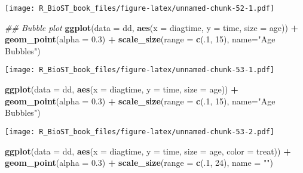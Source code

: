 \documentclass[
]{book}
\newenvironment{Shaded}{\begin{snugshade}}{\end{snugshade}}
\newcommand{\CommentTok}[1]{\textcolor[rgb]{0.56,0.35,0.01}{\textit{#1}}}
\newcommand{\DataTypeTok}[1]{\textcolor[rgb]{0.13,0.29,0.53}{#1}}
\newcommand{\DecValTok}[1]{\textcolor[rgb]{0.00,0.00,0.81}{#1}}
\newcommand{\FloatTok}[1]{\textcolor[rgb]{0.00,0.00,0.81}{#1}}
\newcommand{\KeywordTok}[1]{\textcolor[rgb]{0.13,0.29,0.53}{\textbf{#1}}}
\newcommand{\NormalTok}[1]{#1}
\newcommand{\OperatorTok}[1]{\textcolor[rgb]{0.81,0.36,0.00}{\textbf{#1}}}
\newcommand{\StringTok}[1]{\textcolor[rgb]{0.31,0.60,0.02}{#1}}
\begin{document}
\texttt{[image: R\_BioST\_book\_files/figure-latex/unnamed-chunk-52-1.pdf]}

\begin{Shaded}
\begin{Highlighting}[]
\CommentTok{\#\# Bubble plot}
\KeywordTok{ggplot}\NormalTok{(}\DataTypeTok{data =}\NormalTok{ dd, }\KeywordTok{aes}\NormalTok{(}\DataTypeTok{x =}\NormalTok{ diagtime, }\DataTypeTok{y =}\NormalTok{ time, }\DataTypeTok{size =}\NormalTok{ age)) }\OperatorTok{+}\StringTok{ }
\StringTok{  }\KeywordTok{geom\_point}\NormalTok{(}\DataTypeTok{alpha =} \FloatTok{0.3}\NormalTok{) }\OperatorTok{+}\StringTok{ }
\StringTok{  }\KeywordTok{scale\_size}\NormalTok{(}\DataTypeTok{range =} \KeywordTok{c}\NormalTok{(.}\DecValTok{1}\NormalTok{, }\DecValTok{15}\NormalTok{), }\DataTypeTok{name=}\StringTok{"Age Bubbles"}\NormalTok{)}
\end{Highlighting}
\end{Shaded}

\texttt{[image: R\_BioST\_book\_files/figure-latex/unnamed-chunk-53-1.pdf]}

\begin{Shaded}
\begin{Highlighting}[]
\KeywordTok{ggplot}\NormalTok{(}\DataTypeTok{data =}\NormalTok{ dd, }\KeywordTok{aes}\NormalTok{(}\DataTypeTok{x =}\NormalTok{ diagtime, }\DataTypeTok{y =}\NormalTok{ time, }\DataTypeTok{size =}\NormalTok{ age)) }\OperatorTok{+}\StringTok{ }
\StringTok{  }\KeywordTok{geom\_point}\NormalTok{(}\DataTypeTok{alpha =} \FloatTok{0.3}\NormalTok{) }\OperatorTok{+}\StringTok{ }
\StringTok{  }\KeywordTok{scale\_size}\NormalTok{(}\DataTypeTok{range =} \KeywordTok{c}\NormalTok{(.}\DecValTok{1}\NormalTok{, }\DecValTok{15}\NormalTok{), }\DataTypeTok{name=}\StringTok{"Age Bubbles"}\NormalTok{)}
\end{Highlighting}
\end{Shaded}

\texttt{[image: R\_BioST\_book\_files/figure-latex/unnamed-chunk-53-2.pdf]}

\begin{Shaded}
\begin{Highlighting}[]
\KeywordTok{ggplot}\NormalTok{(}\DataTypeTok{data =}\NormalTok{ dd, }\KeywordTok{aes}\NormalTok{(}\DataTypeTok{x =}\NormalTok{ diagtime, }\DataTypeTok{y =}\NormalTok{ time, }\DataTypeTok{size =}\NormalTok{ age, }\DataTypeTok{color =}\NormalTok{ treat)) }\OperatorTok{+}\StringTok{ }
\StringTok{  }\KeywordTok{geom\_point}\NormalTok{(}\DataTypeTok{alpha =} \FloatTok{0.3}\NormalTok{) }\OperatorTok{+}\StringTok{ }
\KeywordTok{scale\_size}\NormalTok{(}\DataTypeTok{range =} \KeywordTok{c}\NormalTok{(.}\DecValTok{1}\NormalTok{, }\DecValTok{24}\NormalTok{), }\DataTypeTok{name =} \StringTok{""}\NormalTok{)}
\end{Highlighting}
\end{Shaded}
\end{document}
